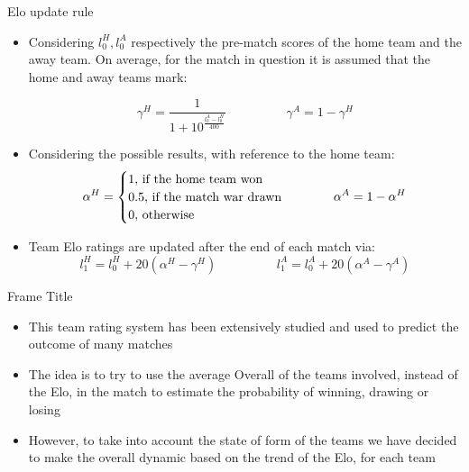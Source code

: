 \documentclass[aspectratio=169,xcolor=dvipsnames]{beamer}
\begin{document}
\begin{frame}{Elo update rule}
\begin{itemize}
 
    \item Considering $ l_0 ^ {H}, l_0 ^ {A} $ respectively the pre-match scores of the home team and the away team. On average, for the match in question it is assumed that the home and away teams mark:
    
    \begin{equation*}
        \gamma^{H} = \frac{1}{1+10^\frac{{l_0^{A} - l_0^{H}}}{400}}
        \hspace{2cm}
        \gamma^{A} = 1-\gamma^{H}
    \end{equation*}
    
    \item Considering the possible results, with reference to the home team:
    \begin{equation*}
        \alpha^H = 
        \begin{cases}
            1,$    if the home team won$ \\
            0.5,$    if the match war drawn$\\
            0, $    otherwise$
        \end{cases}
        \hspace{1cm}
        \alpha^A = 1-\alpha^H
    \end{equation*} 
    
    \item Team Elo ratings are updated after the end of each match via:
    \begin{equation*}
        l_1^H = l_0^H + 20(\alpha^H - \gamma^H) 
        \hspace{2cm}
        l_1^A = l_0^A + 20(\alpha^A - \gamma^A) 
    \end{equation*}
\end{itemize}
\end{frame}


\begin{frame}{Frame Title}
    \begin{itemize}
        \item This team rating system has been extensively studied and used to predict the outcome of many matches\cite{}
        \item The idea is to try to use the average Overall of the teams involved, instead of the Elo, in the match to estimate the probability of winning, drawing or losing
        \item However, to take into account the state of form of the teams we have decided to make the overall dynamic based on the trend of the Elo, for each team
    \end{itemize}
\end{frame}
\end{document}
